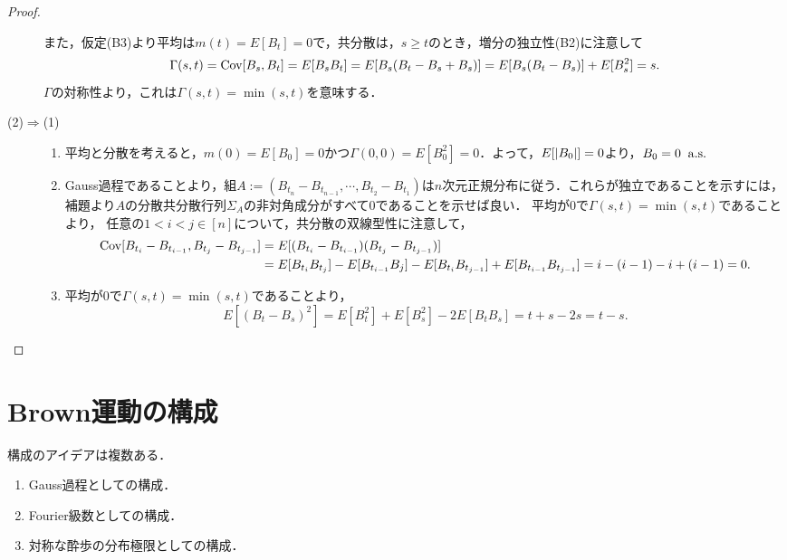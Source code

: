 \documentclass[uplatex,dvipdfmx]{jsreport}
\begin{document}
\begin{proof}
\begin{description}
        また，仮定(B3)より平均は$m(t)=E[B_t]=0$で，共分散は，$s\ge t$のとき，増分の独立性(B2)に注意して
        \[\Gamma(s,t)=\mathrm{Cov}[B_s,B_t]=E[B_sB_t]=E[B_s(B_t-B_s+B_s)]=E[B_s(B_t-B_s)]+E[B_s^2]=s.\]
        $\Gamma$の対称性より，これは$\Gamma(s,t)=\min(s,t)$を意味する．
        \item[(2)$\Rightarrow$(1)]
        \begin{enumerate}[({B}1)]
            \item 平均と分散を考えると，$m(0)=E[B_0]=0$かつ$\Gamma(0,0)=E[B_0^2]=0$．よって，$E[\lvert B_0\rvert]=0$より，$B_0=0\;\;\mathrm{a.s.}$
            \item Gauss過程であることより，組$A:=(B_{t_n}-B_{t_{n-1}},\cdots,B_{t_2}-B_{t_1})$は$n$次元正規分布に従う．これらが独立であることを示すには，補題より$A$の分散共分散行列$\Sigma_A$の非対角成分がすべて$0$であることを示せば良い．
            平均が$0$で$\Gamma(s,t)=\min(s,t)$であることより，
            任意の$1<i< j\in[n]$について，共分散の双線型性に注意して，
            \begin{align*}
                \mathrm{Cov}[B_{t_i}-B_{t_{i-1}},B_{t_j}-B_{t_{j-1}}]&=E[(B_{t_i}-B_{t_{i-1}})(B_{t_j}-B_{t_{j-1}})]\\
                &=E[B_{t_i}B_{t_j}]-E[B_{t_{i-1}}B_j]-E[B_{t_i}B_{t_{j-1}}]+E[B_{t_{i-1}}B_{t_{j-1}}]=i-(i-1)-i+(i-1)=0.
            \end{align*}
            \item 平均が$0$で$\Gamma(s,t)=\min(s,t)$であることより，
            \[E[(B_t-B_s)^2]=E[B_t^2]+E[B_s^2]-2E[B_tB_s]=t+s-2s=t-s.\]
        \end{enumerate}
    \end{description}
\end{proof}

\section{Brown運動の構成}

\begin{tcolorbox}[colframe=ForestGreen, colback=ForestGreen!10!white,breakable,colbacktitle=ForestGreen!40!white,coltitle=black,fonttitle=\bfseries\sffamily,
    title=]
    構成のアイデアは複数ある．
    \begin{enumerate}
        \item Gauss過程としての構成．
        \item Fourier級数としての構成．
        \item 対称な酔歩の分布極限としての構成．
    \end{enumerate}
\end{tcolorbox}
\end{document}
